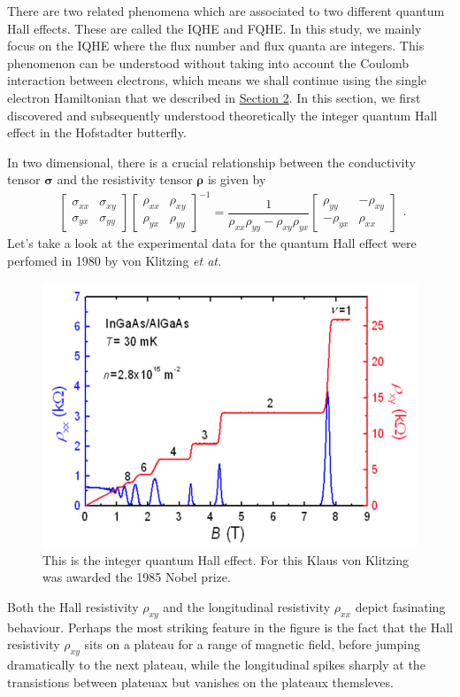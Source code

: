 \documentclass{report}
\newcommand{\f}[2]{\dfrac{#1}{#2}}
\begin{document}
There are two related phenomena which are associated to two different quantum Hall effects. These are called the \ac{IQHE} and \ac{FQHE}. In this study, we mainly focus on the \ac{IQHE} where the flux number and flux quanta are integers. This phenomenon can be understood without taking into account the Coulomb interaction between electrons, which means we shall continue using the single electron Hamiltonian that we described in \hyperref[Section 2]{Section 2}. In this section, we first discovered and subsequently understood theoretically the integer quantum Hall effect in the Hofstadter butterfly.

In two dimensional, there is a crucial relationship between the conductivity tensor $\boldsymbol{\sigma}$ and the resistivity tensor $\boldsymbol{\rho}$ is given by
\begin{equation}
	\begin{aligned}
		\begin{bmatrix}
			\sigma_{xx} & \sigma_{xy} \\
			\sigma_{yx} & \sigma_{yy}
		\end{bmatrix}
		\begin{bmatrix}
			\rho_{xx} & \rho_{xy} \\
			\rho_{yx} & \rho_{yy}
		\end{bmatrix}^{-1}
		=
		\f{1}{\rho_{xx} \rho_{yy} - \rho_{xy} \rho_{yx}}
		\begin{bmatrix}
			\rho_{yy}  & -\rho_{xy} \\
			-\rho_{yx} & \rho_{xx}
		\end{bmatrix}
	\end{aligned}.
\end{equation}
Let's take a look at the experimental data for the quantum Hall effect were perfomed in 1980 by von Klitzing \textit{et at.} \cite{klitzing90}
\begin{figure}[H]
	\centering
	\includegraphics[width=0.7\linewidth]{pic/quantumhall.jpg}
	\caption[Quantum Hall effect by von Klitzing.]{This is the integer quantum Hall effect. For this Klaus von Klitzing was awarded the 1985 Nobel prize.}
\end{figure}
\noindent Both the Hall resistivity $\rho_{xy}$ and the longitudinal resistivity $\rho_{xx}$ depict fasinating behaviour. Perhaps the most striking feature in the figure is the fact that the Hall resistivity $\rho_{xy}$ sits on a plateau for a range of magnetic field, before jumping dramatically to the next plateau, while the longitudinal spikes sharply at the transistions between plateuax but vanishes on the plateaux themsleves. 
\end{document}
